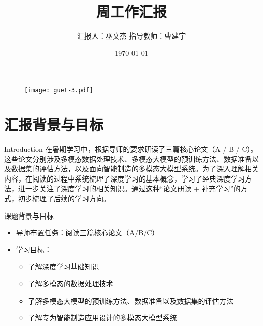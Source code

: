\documentclass[aspectratio=169,AutoFakeBold]{beamer}
\author{汇报人：巫文杰 \texorpdfstring{\quad}{} 指导教师：曹建宇}
\title{周工作汇报}
\institute{计算机与信息安全学院}
\date{\today}
\begin{document}
\kaishu
\begin{frame}
    \titlepage
    \begin{figure}[htpb]
        \begin{center}
            \texttt{[image: guet-3.pdf]}
        \end{center}
    \end{figure}
\end{frame}

\begin{frame}
    \tableofcontents[sectionstyle=show,subsectionstyle=show/shaded/hide,subsubsectionstyle=show/shaded/hide]    
\end{frame}

\section{汇报背景与目标}
\begin{frame}{Introduction}
    \small
    在暑期学习中，根据导师的要求研读了三篇核心论文（A / B / C）。这些论文分别涉及多模态数据处理技术、多模态大模型的预训练方法、数据准备以及数据集的评估方法，以及面向智能制造的多模态大模型系统。为了深入理解相关内容，在阅读的过程中系统梳理了深度学习的基本概念，学习了经典深度学习方法，进一步关注了深度学习的相关知识。通过这种“论文研读 + 补充学习”的方式，初步梳理了后续的学习方向。
\end{frame}
\begin{frame}{课题背景与目标}
    \begin{itemize}
        \item 导师布置任务：阅读三篇核心论文（A/B/C）
        \item 学习目标：
            \begin{itemize}
                \item 了解深度学习基础知识
                \item 了解多模态的数据处理技术
                \item 了解多模态大模型的预训练方法、数据准备以及数据集的评估方法
                \item 了解专为智能制造应用设计的多模态大模型系统
            \end{itemize}
    \end{itemize}
\end{frame}
\end{document}
